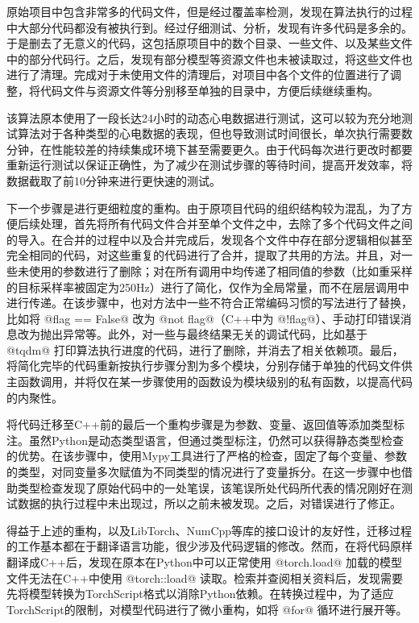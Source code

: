 原始项目中包含非常多的代码文件，但是经过覆盖率检测，发现在算法执行的过程中大部分代码都没有被执行到。经过仔细测试、分析，发现有许多代码是多余的。于是删去了无意义的代码，这包括原项目中的数个目录、一些文件、以及某些文件中的部分代码行。之后，发现有部分模型等资源文件也未被读取过，将这些文件也进行了清理。完成对于未使用文件的清理后，对项目中各个文件的位置进行了调整，将代码文件与资源文件等分别移至单独的目录中，方便后续继续重构。

该算法原本使用了一段长达24小时的动态心电数据进行测试，这可以较为充分地测试算法对于各种类型的心电数据的表现，但也导致测试时间很长，单次执行需要数分钟，在性能较差的持续集成环境下甚至需要更久。由于代码每次进行更改时都要重新运行测试以保证正确性，为了减少在测试步骤的等待时间，提高开发效率，将数据截取了前10分钟来进行更快速的测试。

下一个步骤是进行更细粒度的重构。由于原项目代码的组织结构较为混乱，为了方便后续处理，首先将所有代码文件合并至单个文件之中，去除了多个代码文件之间的导入。在合并的过程中以及合并完成后，发现各个文件中存在部分逻辑相似甚至完全相同的代码，对这些重复的代码进行了合并，提取了共用的方法。并且，对一些未使用的参数进行了删除；对在所有调用中均传递了相同值的参数（比如重采样的目标采样率被固定为250Hz）进行了简化，仅作为全局常量，而不在层层调用中进行传递。在该步骤中，也对方法中一些不符合正常编码习惯的写法进行了替换，比如将 @flag == False@ 改为 @not flag@（C++中为 @!flag@）、手动打印错误消息改为抛出异常等。此外，对一些与最终结果无关的调试代码，比如基于 @tqdm@ 打印算法执行进度的代码，进行了删除，并消去了相关依赖项。最后，将简化完毕的代码重新按执行步骤分割为多个模块，分别存储于单独的代码文件供主函数调用，并将仅在某一步骤使用的函数设为模块级别的私有函数，以提高代码的内聚性。

将代码迁移至C++前的最后一个重构步骤是为参数、变量、返回值等添加类型标注。虽然Python是动态类型语言，但通过类型标注，仍然可以获得静态类型检查的优势。在该步骤中，使用Mypy工具进行了严格的检查，固定了每个变量、参数的类型，对同变量多次赋值为不同类型的情况进行了变量拆分。在这一步骤中也借助类型检查发现了原始代码中的一处笔误，该笔误所处代码所代表的情况刚好在测试数据的执行过程中未出现过，所以之前未被发现。之后，对错误进行了修正。

得益于上述的重构，以及LibTorch、NumCpp等库的接口设计的友好性，迁移过程的工作基本都在于翻译语言功能，很少涉及代码逻辑的修改。然而，在将代码原样翻译成C++后，发现在原本在Python中可以正常使用 @torch.load@ 加载的模型文件无法在C++中使用 @torch::load@ 读取。检索并查阅相关资料后，发现需要先将模型转换为TorchScript格式以消除Python依赖。在转换过程中，为了适应TorchScript的限制，对模型代码进行了微小重构，如将 @for@ 循环进行展开等。

